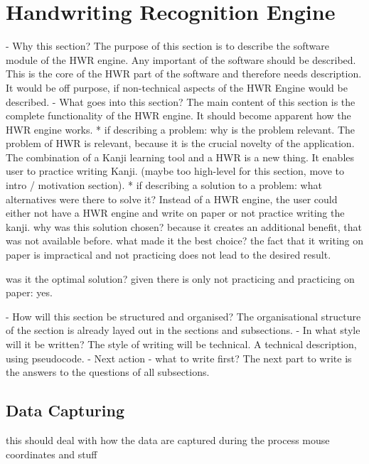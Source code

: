 
\chapter{Handwriting Recognition Engine}
\label{chap:handwritingrecognitionengine}

- Why this section? 
  The purpose of this section is to describe the software module of the 
  HWR engine.
  Any important of the software should be described. This is the core of the
  HWR part of the software and therefore needs description.
  It would be off purpose, if non-technical aspects of the HWR Engine would be 
  described.
- What goes into this section?
  The main content of this section is the complete functionality of the 
  HWR engine.
  It should become apparent how the HWR engine works.
  * if describing a problem: why is the problem relevant.
    The problem of HWR is relevant, because it is the crucial novelty of the
    application. The combination of a Kanji learning tool and a HWR is a new 
    thing. It enables user to practice writing Kanji. (maybe too high-level for
    this section, move to intro / motivation section).
  * if describing a solution to a problem: 
    what alternatives were there to solve it?    
    Instead of a HWR engine, the user could either not have a HWR engine and
    write on paper or not practice writing the kanji.
    why was this solution chosen? 
    because it creates an additional benefit, that was not available before.
    what made it the best choice? 
    the fact that it writing on paper is impractical and not practicing does
    not lead to the desired result.

    was it the optimal solution? given there is only not practicing and
    practicing on paper: yes.

- How will this section be structured and organised?
  The organisational structure of the section is already layed out in the
  sections and subsections.
- In what style will it be written?
  The style of writing will be technical. A technical description, using
  pseudocode.
- Next action - what to write first?
  The next part to write is the answers to the questions of all subsections.


\section{Data Capturing}
\label{sec:hwre:datacapturing}
this should deal with how the data are captured during the process
mouse coordinates and stuff

